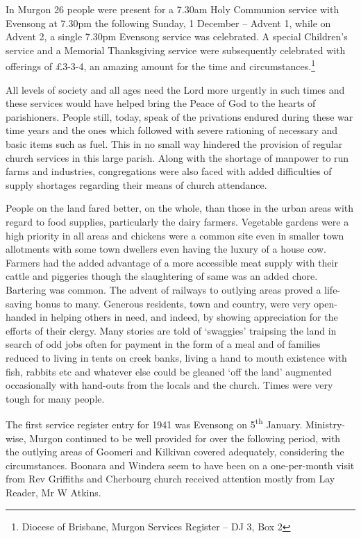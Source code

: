 In Murgon 26 people were present for a 7.30am Holy Communion service with Evensong at 7.30pm the following Sunday, 1 December -- Advent 1, while on Advent 2, a single 7.30pm Evensong service was celebrated. A special Children's service and a Memorial Thanksgiving service were subsequently celebrated with offerings of £3-3-4, an amazing amount for the time and circumstances.\footnote{Diocese of Brisbane, Murgon Services Register -- DJ 3, Box 2}

All levels of society and all ages need the Lord more urgently in such times and these services would have helped bring the Peace of God to the hearts of parishioners. People still, today, speak of the privations endured during these war time years and the ones which followed with severe rationing of necessary and basic items such as fuel. This in no small way hindered the provision of regular church services in this large parish. Along with the shortage of manpower to run farms and industries, congregations were also faced with added difficulties of supply shortages regarding their means of church attendance.

People on the land fared better, on the whole, than those in the urban areas with regard to food supplies, particularly the dairy farmers. Vegetable gardens were a high priority in all areas and chickens were a common site even in smaller town allotments with some town dwellers even having the luxury of a house cow. Farmers had the added advantage of a more accessible meat supply with their cattle and piggeries though the slaughtering of same was an added chore. Bartering was common. The advent of railways to outlying areas proved a life-saving bonus to many. Generous residents, town and country, were very open-handed in helping others in need, and indeed, by showing appreciation for the efforts of their clergy. Many stories are told of `swaggies' traipsing the land in search of odd jobs often for payment in the form of a meal and of families reduced to living in tents on creek banks, living a hand to mouth existence with fish, rabbits etc and whatever else could be gleaned `off the land' augmented occasionally with hand-outs from the locals and the church. Times were very tough for many people.

The first service register entry for 1941 was Evensong on 5\textsuperscript{th} January. Ministry-wise, Murgon continued to be well provided for over the following period, with the outlying areas of Goomeri and Kilkivan covered adequately, considering the circumstances. Boonara and Windera seem to have been on a one-per-month visit from Rev Griffiths and Cherbourg church received attention mostly from Lay Reader, Mr W Atkins.

